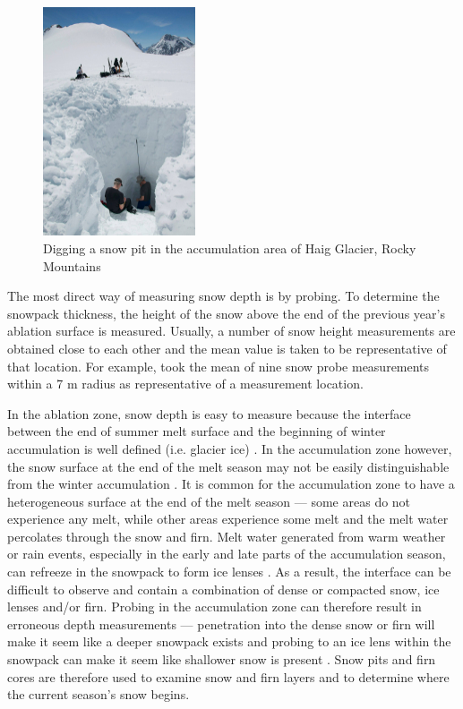 \documentclass{sfuthesis}
\begin{document}
\label{snowprobing}
\begin{figure}[H]
 \centering
      \includegraphics[width=0.4\textwidth]{snowpit.jpg}
  \caption{Digging a snow pit in the accumulation area of Haig Glacier, Rocky Mountains}
        \label{snowpit}
\end{figure}

The most direct way of measuring snow depth is by probing. To determine the snowpack thickness, the height of the snow above the end of the previous year's ablation surface is measured. Usually, a number of snow height measurements are obtained close to each other and the mean value is taken to be representative of that location. For example, \cite{Machguth2006} took the mean of nine snow probe measurements within a 7 m radius as representative of a measurement location.  

In the ablation zone, snow depth is easy to measure because the interface between the end of summer melt surface and the beginning of winter accumulation is well defined (i.e. glacier ice) \citep{McGrath2015}. In the accumulation zone however, the snow surface at the end of the melt season may not be easily distinguishable from the winter accumulation \citep{Grunewald2010}. It is common for the accumulation zone to have a heterogeneous surface at the end of the melt season --- some areas do not experience any melt,  while other areas experience some melt and the melt water percolates through the snow and firn. Melt water generated from warm weather or rain events, especially in the early and late parts of the accumulation season, can refreeze in the snowpack to form ice lenses \citep{Sold2014}. As a result, the interface can be difficult to observe and contain a combination of dense or compacted snow, ice lenses and/or firn.  Probing in the accumulation zone can therefore result in erroneous depth measurements --- penetration into the dense snow or firn will make it seem like a deeper snowpack exists and probing to an ice lens within the snowpack can make it seem like shallower snow is present \citep{Sold2013}. Snow pits and firn cores are therefore used to examine snow and firn layers and to determine where the current season's snow begins.
\end{document}
